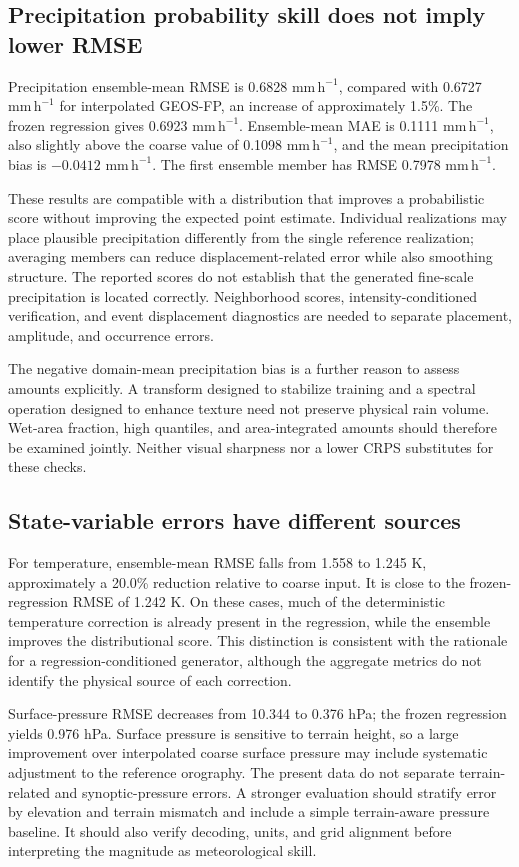 \documentclass[10pt]{article}
\newcommand{\rainunit}{\mathrm{mm\,h^{-1}}}
\begin{document}
\subsection{Precipitation probability skill does not imply lower RMSE}
Precipitation ensemble-mean RMSE is 0.6828 $\rainunit$, compared with 0.6727 $\rainunit$ for interpolated GEOS-FP, an increase of approximately 1.5\%. The frozen regression gives 0.6923 $\rainunit$. Ensemble-mean MAE is 0.1111 $\rainunit$, also slightly above the coarse value of 0.1098 $\rainunit$, and the mean precipitation bias is $-0.0412$ $\rainunit$. The first ensemble member has RMSE 0.7978 $\rainunit$.

These results are compatible with a distribution that improves a probabilistic score without improving the expected point estimate. Individual realizations may place plausible precipitation differently from the single reference realization; averaging members can reduce displacement-related error while also smoothing structure. The reported scores do not establish that the generated fine-scale precipitation is located correctly. Neighborhood scores, intensity-conditioned verification, and event displacement diagnostics are needed to separate placement, amplitude, and occurrence errors.

The negative domain-mean precipitation bias is a further reason to assess amounts explicitly. A transform designed to stabilize training and a spectral operation designed to enhance texture need not preserve physical rain volume. Wet-area fraction, high quantiles, and area-integrated amounts should therefore be examined jointly. Neither visual sharpness nor a lower CRPS substitutes for these checks.

\subsection{State-variable errors have different sources}
For temperature, ensemble-mean RMSE falls from 1.558 to 1.245 K, approximately a 20.0\% reduction relative to coarse input. It is close to the frozen-regression RMSE of 1.242 K. On these cases, much of the deterministic temperature correction is already present in the regression, while the ensemble improves the distributional score. This distinction is consistent with the rationale for a regression-conditioned generator, although the aggregate metrics do not identify the physical source of each correction.

Surface-pressure RMSE decreases from 10.344 to 0.376 hPa; the frozen regression yields 0.976 hPa. Surface pressure is sensitive to terrain height, so a large improvement over interpolated coarse surface pressure may include systematic adjustment to the reference orography. The present data do not separate terrain-related and synoptic-pressure errors. A stronger evaluation should stratify error by elevation and terrain mismatch and include a simple terrain-aware pressure baseline. It should also verify decoding, units, and grid alignment before interpreting the magnitude as meteorological skill.
\end{document}
